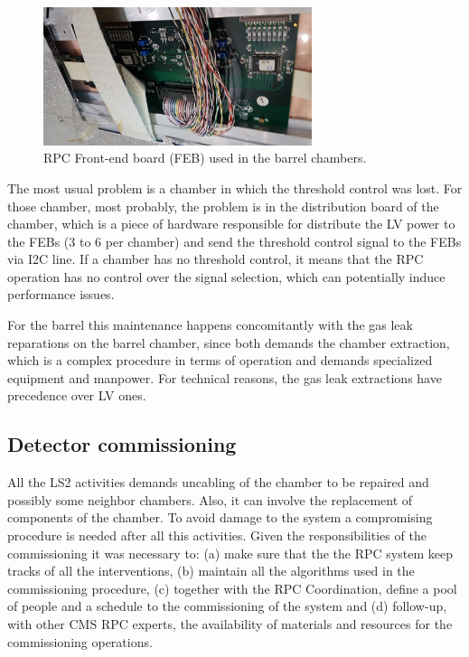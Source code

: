 \begin{figure}[h]
\begin{center}
\includegraphics[width=0.7\textwidth,keepaspectratio]{figures/rpc/rpc_feb.jpg}
\end{center}
\caption{RPC Front-end board (FEB) used in the barrel chambers.}\label{rpc_feb}
\end{figure}

The most usual problem is a chamber in which the threshold control was lost. For those chamber, most probably, the problem is in the distribution board of the chamber, which is a piece of hardware responsible for distribute the LV power to the FEBs (3 to 6 per chamber) and send the threshold control signal to the FEBs via I2C line. If a chamber has no threshold control, it means that the RPC operation has no control over the signal selection, which can potentially induce performance issues. 

For the barrel this maintenance happens concomitantly with the gas leak reparations on the barrel chamber, since both demands the chamber extraction, which is a complex procedure in terms of operation and demands specialized equipment and manpower. For technical reasons, the gas leak extractions have precedence over LV ones.



\subsection{Detector commissioning}
 
All the LS2 activities demands uncabling of the chamber to be repaired and possibly some neighbor chambers. Also, it can involve the replacement of components of the chamber. To avoid damage to the system a compromising procedure is needed after all this activities. Given the responsibilities of the commissioning it was necessary to: (a) make sure that the the RPC system keep tracks of all the interventions, (b) maintain all the algorithms used in the commissioning procedure, (c) together with the RPC Coordination, define a pool of people and a schedule to the commissioning of the system and (d) follow-up, with other CMS RPC experts, the availability of materials and resources for the commissioning operations.

